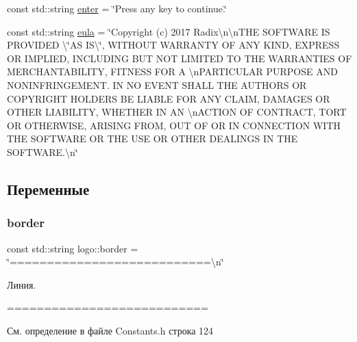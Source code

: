 \begin{DoxyCompactItemize}
\item 
const std\+::string \hyperlink{namespacelogo_ac55b3c4624556820a987ccdf67101bae}{enter} = \char`\"{}Press any key to continue.\char`\"{}
\item 
const std\+::string \hyperlink{namespacelogo_ae3d10c2b731b19f239a7311af363354c}{eula} = \char`\"{}Copyright (c) 2017 Radix\textbackslash{}n\textbackslash{}n\+T\+HE S\+O\+F\+T\+W\+A\+RE IS P\+R\+O\+V\+I\+D\+ED \textbackslash{}\char`\"{}AS I\+S\textbackslash{}\char`\"{}, W\+I\+T\+H\+O\+UT W\+A\+R\+R\+A\+N\+TY OF A\+NY K\+I\+ND, E\+X\+P\+R\+E\+SS OR I\+M\+P\+L\+I\+ED, I\+N\+C\+L\+U\+D\+I\+NG B\+UT N\+OT L\+I\+M\+I\+T\+ED TO T\+HE W\+A\+R\+R\+A\+N\+T\+I\+ES OF M\+E\+R\+C\+H\+A\+N\+T\+A\+B\+I\+L\+I\+TY, F\+I\+T\+N\+E\+SS F\+OR A \textbackslash{}n\+P\+A\+R\+T\+I\+C\+U\+L\+AR P\+U\+R\+P\+O\+SE A\+ND N\+O\+N\+I\+N\+F\+R\+I\+N\+G\+E\+M\+E\+N\+T. IN NO E\+V\+E\+NT S\+H\+A\+LL T\+HE A\+U\+T\+H\+O\+RS OR C\+O\+P\+Y\+R\+I\+G\+HT H\+O\+L\+D\+E\+RS BE L\+I\+A\+B\+LE F\+OR A\+NY C\+L\+A\+IM, D\+A\+M\+A\+G\+ES OR O\+T\+H\+ER L\+I\+A\+B\+I\+L\+I\+TY, W\+H\+E\+T\+H\+ER IN AN \textbackslash{}n\+A\+C\+T\+I\+ON OF C\+O\+N\+T\+R\+A\+CT, T\+O\+RT OR O\+T\+H\+E\+R\+W\+I\+SE, A\+R\+I\+S\+I\+NG F\+R\+OM, O\+UT OF OR IN C\+O\+N\+N\+E\+C\+T\+I\+ON W\+I\+TH T\+HE S\+O\+F\+T\+W\+A\+RE OR T\+HE U\+SE OR O\+T\+H\+ER D\+E\+A\+L\+I\+N\+GS IN T\+HE S\+O\+F\+T\+W\+A\+R\+E.\textbackslash{}n\char`\"{}
\end{DoxyCompactItemize}


\subsection{Переменные}
\mbox{\label{namespacelogo_a75fab9a3dcd27565e40b08dbbcbf5e6b}} 
\subsubsection{\texorpdfstring{border}{border}}
{\footnotesize\ttfamily const std\+::string logo\+::border = \char`\"{}===========================\textbackslash{}n\char`\"{}}

Линия. 
\begin{DoxyCode}
===========================
\end{DoxyCode}
 

См. определение в файле Constants.\+h строка 124

\mbox{\label{namespacelogo_ac55b3c4624556820a987ccdf67101bae}} 
